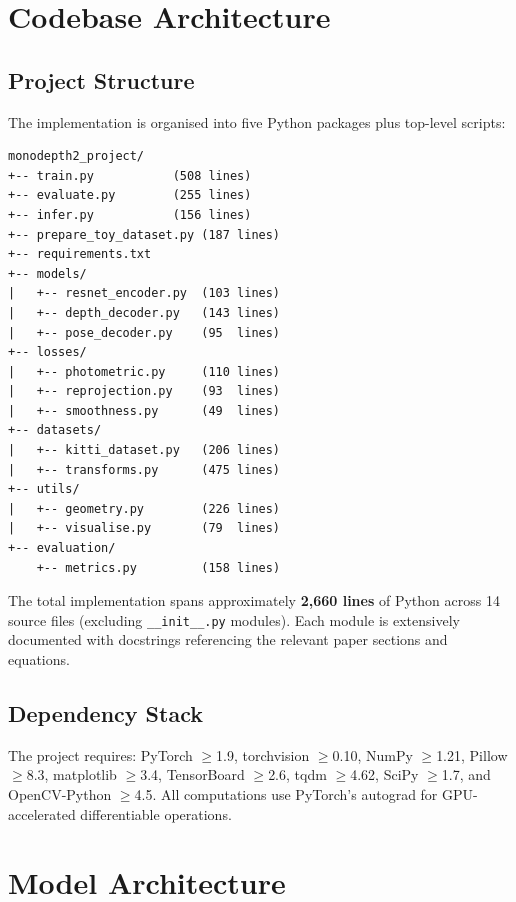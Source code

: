 \documentclass[10pt, a4paper, twocolumn]{article}
\begin{document}
\section{Codebase Architecture}
\label{sec:codebase}

\subsection{Project Structure}

The implementation is organised into five Python packages plus top-level scripts:

\begin{lstlisting}[language={}, basicstyle=\ttfamily\tiny, frame=none, numbers=none]
monodepth2_project/
+-- train.py           (508 lines)
+-- evaluate.py        (255 lines)
+-- infer.py           (156 lines)
+-- prepare_toy_dataset.py (187 lines)
+-- requirements.txt
+-- models/
|   +-- resnet_encoder.py  (103 lines)
|   +-- depth_decoder.py   (143 lines)
|   +-- pose_decoder.py    (95  lines)
+-- losses/
|   +-- photometric.py     (110 lines)
|   +-- reprojection.py    (93  lines)
|   +-- smoothness.py      (49  lines)
+-- datasets/
|   +-- kitti_dataset.py   (206 lines)
|   +-- transforms.py      (475 lines)
+-- utils/
|   +-- geometry.py        (226 lines)
|   +-- visualise.py       (79  lines)
+-- evaluation/
    +-- metrics.py         (158 lines)
\end{lstlisting}

The total implementation spans approximately \textbf{2,660 lines} of Python across 14 source files (excluding \texttt{\_\_init\_\_.py} modules). Each module is extensively documented with docstrings referencing the relevant paper sections and equations.

\subsection{Dependency Stack}

The project requires: PyTorch $\geq$1.9, torchvision $\geq$0.10, NumPy $\geq$1.21, Pillow $\geq$8.3, matplotlib $\geq$3.4, TensorBoard $\geq$2.6, tqdm $\geq$4.62, SciPy $\geq$1.7, and OpenCV-Python $\geq$4.5. All computations use PyTorch's autograd for GPU-accelerated differentiable operations.

\section{Model Architecture}
\label{sec:arch}
\end{document}
